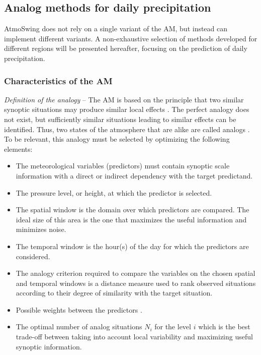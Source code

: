 \documentclass[gmdd]{copernicus}
\begin{document}
\subsection{Analog methods for daily precipitation}
\label{sec:method}

AtmoSwing does not rely on a single variant of the AM, but instead can implement different variants. A non-exhaustive selection of methods developed for different regions will be presented hereafter, focusing on the prediction of daily precipitation. 


\subsubsection{Characteristics of the AM}

\textit{Definition of the analogy} -- The AM is based on the principle that two similar synoptic situations may produce similar local effects \citep{Lorenz1956}. The perfect analogy does not exist, but sufficiently similar situations leading to similar effects can be identified. Thus, two states of the atmosphere that are alike are called analogs \citep{Lorenz1969}. To be relevant, this analogy must be selected by optimizing the following elements:

\begin{itemize}		
	\item The meteorological variables (predictors) must contain synoptic scale information with a direct or indirect dependency with the target predictand.
	\item The pressure level, or height, at which the predictor is selected.
	\item The spatial window is the domain over which predictors are compared. The ideal size of this area is the one that maximizes the useful information and minimizes noise.
	\item The temporal window is the hour(s) of the day for which the predictors are considered.
	\item The analogy criterion required to compare the variables on the chosen spatial and temporal windows is a distance measure used to rank observed situations according to their degree of similarity with the target situation.
	\item Possible weights between the predictors \cite[e.g.,][]{Horton2017b, Junk2015}.
	\item The optimal number of analog situations $N_{i}$ for the level $i$ which is the best trade-off between taking into account local variability and maximizing useful synoptic information.
\end{itemize}
\end{document}
